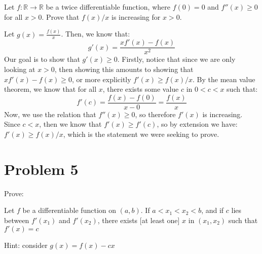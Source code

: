 \documentclass[10pt]{article}
\begin{document}
	Let $f : \mathbb R \to \mathbb R$ be a twice differentiable function, where $f(0) = 0$ and $f''(x) \ge 0$ 
	for all $x > 0$. Prove that $f(x)/x$ is increasing for $x > 0$. 

	\begin{solution}
		Let $g(x) = \frac{f(x)}{x}$. Then, we know that: 
		\[
		g'(x) = \frac{xf'(x) - f(x)}{x^2}
		\] 
		Our goal is to show that $g'(x) \ge 0$. Firstly, notice that since we are only looking at $x > 0$, then
		showing this amounts to showing that $xf'(x) - f(x) \ge 0$, or more explicitly $f'(x) \ge f(x)/x$. By 
		the mean value theorem, we know that for all $x$, there exists some value $c$ in $0 < c < x$ such that:
		\[
		f'(c) = \frac{f(x) - f(0)}{x-0} = \frac{f(x)}{x}
		\] 
		Now, we use the relation that $f''(x) \ge 0$, so therefore $f'(x)$ is increasing. Since $c < x$, then 
		we know that $f'(x) \ge f'(c)$, so by extension we have: $f'(x) \ge f(x)/x$, which is the statement we
		were seeking to prove. 
	\end{solution}

	\pagebreak

	\section*{Problem 5}
	Prove: 

	\begin{theorem}
		Let $f$ be a differentiable function on $(a, b)$. If $a < x_1 < x_2< b$, and if $c$ lies between 
		$f'(x_1)$ and $f'(x_2)$, there exists [at least one] $x$ in $(x_1, x_2)$ such that $f'(x) = c$
	\end{theorem}

	Hint: consider $g(x)= f(x) -cx$
\end{document}

